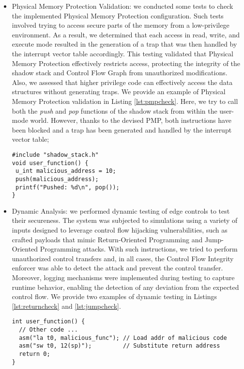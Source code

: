 \begin{itemize}
  \item Physical Memory Protection Validation: we conducted some tests to check
    the implemented Physical Memory Protection configuration. Such tests involved
    trying to access secure parts of the memory from a low-privilege environment.
    As a result, we determined that each access in read, write, and execute mode
    resulted in the generation of a trap that was then handled by the interrupt vector
    table accordingly. This testing validated that Physical Memory Protection
    effectively restricts access, protecting the integrity of the shadow stack and
    Control Flow Graph from unauthorized modifications. Also, we assessed that higher
    privilege code can effectively access the data structures without generating
    traps. We provide an example of Physical Memory Protection validation in
    Listing \ref{lst:pmpcheck}. Here, we try to call both the \textit{push} and \textit{pop}
    functions of the shadow stack from within the user-mode world. However,
    thanks to the devised PMP, both instructions have been blocked and a trap has
    been generated and handled by the interrupt vector table;

    \begin{lstlisting}[style=CStyle, caption = Physical Memory Protection testing, label={lst:pmpcheck}]
#include "shadow_stack.h"
void user_function() {
 u_int malicious_address = 10;
 push(malicious_address);
 printf("Pushed: %d\n", pop());
}
 \end{lstlisting}

  \item Dynamic Analysis: we performed dynamic testing of edge controls to test
    their secureness. The system was subjected to simulations using a variety of
    inputs designed to leverage control flow hijacking vulnerabilities, such as
    crafted payloads that mimic Return-Oriented Programming and Jump-Oriented
    Programming attacks. With such instructions, we tried to perform
    unauthorized control transfers and, in all cases, the Control Flow Integrity
    enforcer was able to detect the attack and prevent the control transfer. Moreover,
    logging mechanisms were implemented during testing to capture runtime
    behavior, enabling the detection of any deviation from the expected control flow.
    We provide two examples of dynamic testing in Listings \ref{lst:returncheck}
    and \ref{lst:jumpcheck}.

    \begin{lstlisting}[style=CStyle, caption = Return-Oriented Programming simulation attack, label={lst:returncheck}]
int user_function() {
  // Other code ...
  asm("la t0, malicious_func"); // Load addr of malicious code
  asm("sw t0, 12(sp)");         // Substitute return address
  return 0;
}
       \end{lstlisting}


\end{itemize}
